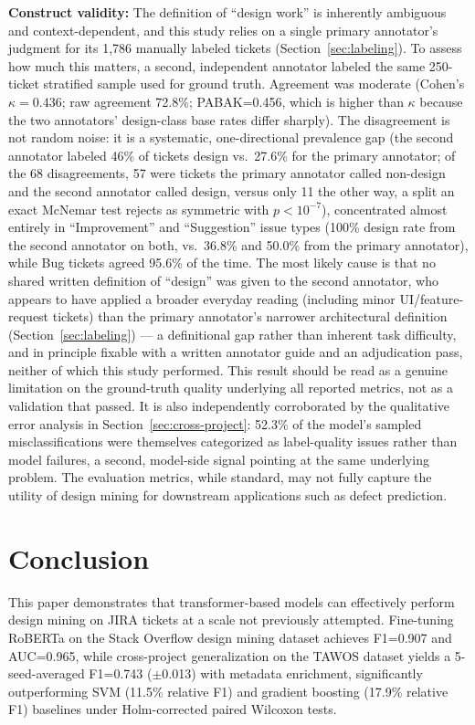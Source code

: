 \documentclass[preprint,12pt]{elsarticle}
\begin{document}
\textbf{Construct validity:} The definition of ``design work'' is inherently ambiguous and context-dependent, and this study relies on a single primary annotator's judgment for its 1,786 manually labeled tickets (Section~\ref{sec:labeling}). To assess how much this matters, a second, independent annotator labeled the same 250-ticket stratified sample used for ground truth. Agreement was moderate (Cohen's $\kappa=0.436$; raw agreement 72.8\%; PABAK=0.456, which is higher than $\kappa$ because the two annotators' design-class base rates differ sharply). The disagreement is not random noise: it is a systematic, one-directional prevalence gap (the second annotator labeled 46\% of tickets design vs.\ 27.6\% for the primary annotator; of the 68 disagreements, 57 were tickets the primary annotator called non-design and the second annotator called design, versus only 11 the other way, a split an exact McNemar test rejects as symmetric with $p<10^{-7}$), concentrated almost entirely in ``Improvement'' and ``Suggestion'' issue types (100\% design rate from the second annotator on both, vs.\ 36.8\% and 50.0\% from the primary annotator), while Bug tickets agreed 95.6\% of the time. The most likely cause is that no shared written definition of ``design'' was given to the second annotator, who appears to have applied a broader everyday reading (including minor UI/feature-request tickets) than the primary annotator's narrower architectural definition (Section~\ref{sec:labeling}) — a definitional gap rather than inherent task difficulty, and in principle fixable with a written annotator guide and an adjudication pass, neither of which this study performed. This result should be read as a genuine limitation on the ground-truth quality underlying all reported metrics, not as a validation that passed. It is also independently corroborated by the qualitative error analysis in Section~\ref{sec:cross-project}: 52.3\% of the model's sampled misclassifications were themselves categorized as label-quality issues rather than model failures, a second, model-side signal pointing at the same underlying problem. The evaluation metrics, while standard, may not fully capture the utility of design mining for downstream applications such as defect prediction.

\section{Conclusion}

This paper demonstrates that transformer-based models can effectively perform design mining on JIRA tickets at a scale not previously attempted. Fine-tuning RoBERTa on the Stack Overflow design mining dataset achieves F1=0.907 and AUC=0.965, while cross-project generalization on the TAWOS dataset yields a 5-seed-averaged F1=0.743 ($\pm$0.013) with metadata enrichment, significantly outperforming SVM (11.5\% relative F1) and gradient boosting (17.9\% relative F1) baselines under Holm-corrected paired Wilcoxon tests.
\end{document}
